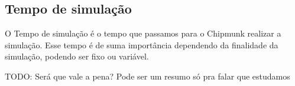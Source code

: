 \subsection{Tempo de simulação}

O Tempo de simulação é o tempo que passamos para o Chipmunk realizar a simulação. Esse tempo é de suma importância dependendo da finalidade da simulação, podendo 
ser fixo ou variável. 

TODO: Será que vale a pena? Pode ser um resumo só pra falar que estudamos
